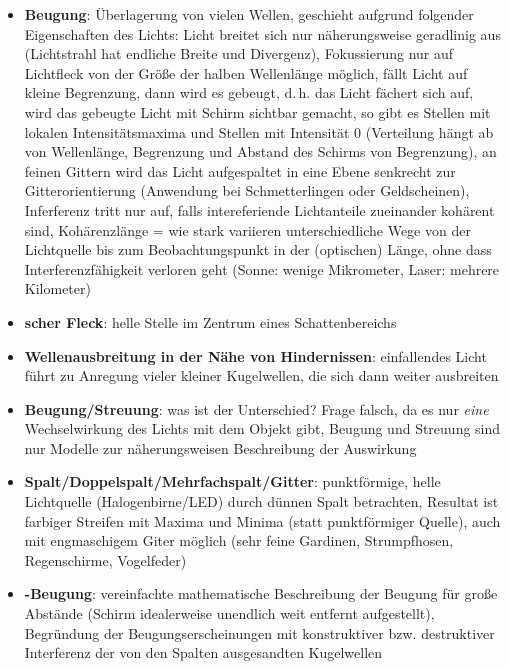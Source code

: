 \linie
\pagebreak
\begin{itemize}
    \item
    \textbf{Beugung}:
    Überlagerung von vielen Wellen, geschieht aufgrund folgender Eigenschaften
    des Lichts:
    Licht breitet sich nur näherungsweise geradlinig aus
    (Lichtstrahl hat endliche Breite und Divergenz),
    Fokussierung nur auf Lichtfleck von der Größe der halben Wellenlänge
    möglich,
    fällt Licht auf kleine Begrenzung, dann wird es gebeugt, d.\,h.
    das Licht fächert sich auf,
    wird das gebeugte Licht mit Schirm sichtbar gemacht, so
    gibt es Stellen mit lokalen Intensitätsmaxima und Stellen mit
    Intensität $0$
    (Verteilung hängt ab von Wellenlänge, Begrenzung und Abstand des Schirms
    von Begrenzung),
    an feinen Gittern wird das Licht aufgespaltet in eine Ebene senkrecht
    zur Gitterorientierung (Anwendung bei Schmetterlingen oder Geldscheinen),
    Inferferenz tritt nur auf, falls intereferiende Lichtanteile zueinander
    kohärent sind,
    Kohärenzlänge = wie stark variieren unterschiedliche Wege
    von der Lichtquelle bis zum Beobachtungspunkt in der (optischen) Länge,
    ohne dass Interferenzfähigkeit verloren geht
    (Sonne: wenige Mikrometer, Laser: mehrere Kilometer)
    
    \item
    \textbf{scher Fleck}:
    helle Stelle im Zentrum eines Schattenbereichs
    
    \item
    \textbf{Wellenausbreitung in der Nähe von Hindernissen}:
    einfallendes Licht führt zu Anregung vieler kleiner Kugelwellen,
    die sich dann weiter ausbreiten
    
    \item
    \textbf{Beugung/Streuung}:
    was ist der Unterschied?
    Frage falsch, da es nur \emph{eine} Wechselwirkung des Lichts mit dem
    Objekt gibt, Beugung und Streuung sind nur Modelle zur
    näherungsweisen Beschreibung der Auswirkung
\end{itemize}
\linie
\begin{itemize}
    \item
    \textbf{Spalt/Doppelspalt/Mehrfachspalt/Gitter}:
    punktförmige, helle Lichtquelle (Halogenbirne/LED) durch
    dünnen Spalt betrachten,
    Resultat ist farbiger Streifen mit Maxima und Minima
    (statt punktförmiger Quelle), auch mit engmaschigem Giter möglich
    (sehr feine Gardinen, Strumpfhosen, Regenschirme, Vogelfeder)
    
    \item
    \textbf{-Beugung}:
    vereinfachte mathematische Beschreibung der Beugung für große Abstände
    (Schirm idealerweise unendlich weit entfernt aufgestellt),
    Begründung der Beugungserscheinungen mit konstruktiver bzw. destruktiver
    Interferenz der von den Spalten ausgesandten Kugelwellen
\end{itemize}
